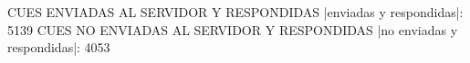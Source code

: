 CUES ENVIADAS AL SERVIDOR Y RESPONDIDAS
|enviadas y respondidas|: 5139
CUES NO ENVIADAS AL SERVIDOR Y RESPONDIDAS
|no enviadas y respondidas|: 4053